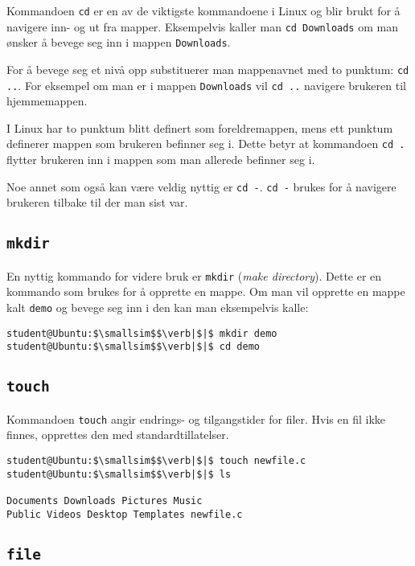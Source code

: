\begin{alphasection}
Kommandoen \verb|cd| er en av de viktigste kommandoene i Linux og blir brukt for å navigere inn- og ut fra mapper. Eksempelvis kaller man \verb|cd Downloads| om man ønsker å bevege seg inn i mappen \verb|Downloads|.

For å bevege seg et nivå opp substituerer man mappenavnet med to punktum: \verb|cd ..|. For eksempel om man er i mappen \verb|Downloads| vil \verb|cd ..| navigere brukeren til hjemmemappen.

I Linux har to punktum blitt definert som foreldremappen, mens ett punktum definerer mappen som brukeren befinner seg i. Dette betyr at kommandoen \verb|cd .| flytter brukeren inn i mappen som man allerede befinner seg i.

Noe annet som også kan være veldig nyttig er \verb|cd -|. \verb|cd -| brukes for å navigere brukeren tilbake til der man sist var. 

\cprotect\subsection{\lstinline{mkdir}}
En nyttig kommando for videre bruk er \verb|mkdir| (\textit{make directory}). Dette er en kommando som brukes for å opprette en mappe. Om man vil opprette en mappe kalt \verb|demo| og bevege seg inn i den kan man eksempelvis
 kalle:

\begin{lstlisting}[mathescape=true]
student@Ubuntu:$\smallsim$$\verb|$|$ mkdir demo
student@Ubuntu:$\smallsim$$\verb|$|$ cd demo
\end{lstlisting}

\cprotect\subsection{\lstinline{touch}}

Kommandoen \verb|touch| angir endrings- og tilgangstider for filer.  Hvis en fil ikke finnes, opprettes den med standardtillatelser. 

\begin{lstlisting}[mathescape=true]
student@Ubuntu:$\smallsim$$\verb|$|$ touch newfile.c
student@Ubuntu:$\smallsim$$\verb|$|$ ls

Documents Downloads Pictures Music
Public Videos Desktop Templates newfile.c
\end{lstlisting}


\cprotect\subsection{\lstinline{file}}


\end{alphasection}
